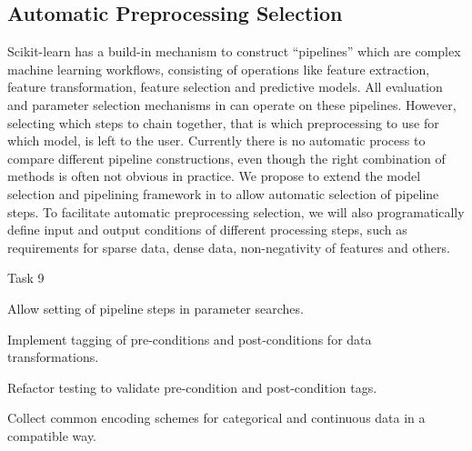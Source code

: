 \subsection{Automatic Preprocessing Selection}
Scikit-learn has a build-in mechanism to construct ``pipelines'' which are complex 
machine learning workflows, consisting of operations like feature extraction,
feature transformation, feature selection and predictive models.
All evaluation and parameter selection mechanisms in \sklearn{} can operate
on these pipelines.
However, selecting which steps to chain together, that is which preprocessing
to use for which model, is left to the user. Currently there is no
automatic process to compare different pipeline constructions, even though
the right combination of methods is often not obvious in practice.
We propose to extend the model selection and pipelining framework in \sklearn{}
to allow automatic selection of pipeline steps.
To facilitate automatic preprocessing selection, we will also programatically
define input and output conditions of different processing steps, such
as requirements for sparse data, dense data, non-negativity of features and others.
\begin{labeling}{Task 9}
    \item [Task 6] Allow setting of pipeline steps in \sklearn{} parameter searches.
    \item [Task 7] Implement tagging of pre-conditions and post-conditions for data transformations.
    \item [Task 8] Refactor \sklearn{} testing to validate pre-condition and post-condition tags.
    \item [Task 9] Collect common encoding schemes for categorical and
        continuous data in a \sklearn{} compatible way.
\end{labeling}

